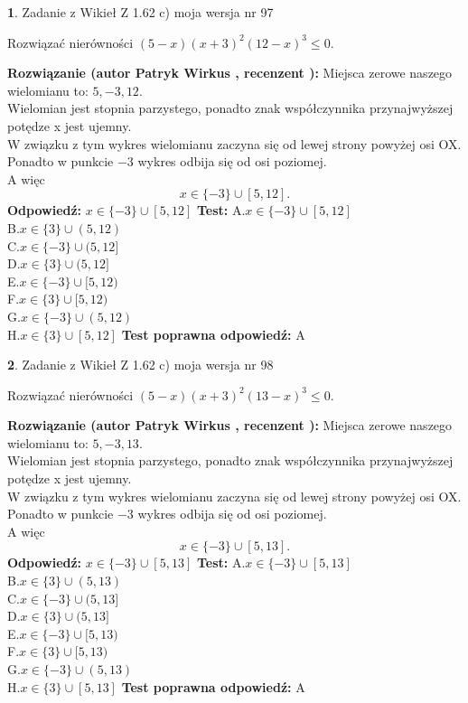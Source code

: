 \documentclass[12pt, a4paper]{article}
\theoremstyle{definition} %
\newtheorem{zad}{}
\newcommand{\zadStart}[1]{\begin{zad}#1\newline}
\newcommand{\zadStop}{\end{zad}}
\newcommand{\rozwStart}[2]{\noindent \textbf{Rozwiązanie (autor #1 , recenzent #2): }\newline}
\newcommand{\rozwStop}{\newline}
\newcommand{\odpStart}{\noindent \textbf{Odpowiedź:}\newline}
\newcommand{\odpStop}{\newline}
\newcommand{\testStart}{\noindent \textbf{Test:}\newline}
\newcommand{\testStop}{\newline}
\newcommand{\kluczStart}{\noindent \textbf{Test poprawna odpowiedź:}\newline}
\newcommand{\kluczStop}{\newline}
\begin{document}
\zadStart{Zadanie z Wikieł Z 1.62 c) moja wersja nr 97}

Rozwiązać nierówności $(5-x)(x+3)^{2}(12-x)^{3}\le0$.
\zadStop
\rozwStart{Patryk Wirkus}{}
Miejsca zerowe naszego wielomianu to: $5, -3, 12$.\\
Wielomian jest stopnia parzystego, ponadto znak współczynnika przy\linebreak najwyższej potędze x jest ujemny.\\ W związku z tym wykres wielomianu zaczyna się od lewej strony powyżej osi OX.\\
Ponadto w punkcie $-3$ wykres odbija się od osi poziomej.\\
A więc $$x \in \{-3\} \cup [5,12].$$
\rozwStop
\odpStart
$x \in \{-3\} \cup [5,12]$
\odpStop
\testStart
A.$x \in \{-3\} \cup [5,12]$\\
B.$x \in \{3\} \cup (5,12)$\\
C.$x \in \{-3\} \cup (5,12]$\\
D.$x \in \{3\} \cup (5,12]$\\
E.$x \in \{-3\} \cup [5,12)$\\
F.$x \in \{3\} \cup [5,12)$\\
G.$x \in \{-3\} \cup (5,12)$\\
H.$x \in \{3\} \cup [5,12]$
\testStop
\kluczStart
A
\kluczStop



\zadStart{Zadanie z Wikieł Z 1.62 c) moja wersja nr 98}

Rozwiązać nierówności $(5-x)(x+3)^{2}(13-x)^{3}\le0$.
\zadStop
\rozwStart{Patryk Wirkus}{}
Miejsca zerowe naszego wielomianu to: $5, -3, 13$.\\
Wielomian jest stopnia parzystego, ponadto znak współczynnika przy\linebreak najwyższej potędze x jest ujemny.\\ W związku z tym wykres wielomianu zaczyna się od lewej strony powyżej osi OX.\\
Ponadto w punkcie $-3$ wykres odbija się od osi poziomej.\\
A więc $$x \in \{-3\} \cup [5,13].$$
\rozwStop
\odpStart
$x \in \{-3\} \cup [5,13]$
\odpStop
\testStart
A.$x \in \{-3\} \cup [5,13]$\\
B.$x \in \{3\} \cup (5,13)$\\
C.$x \in \{-3\} \cup (5,13]$\\
D.$x \in \{3\} \cup (5,13]$\\
E.$x \in \{-3\} \cup [5,13)$\\
F.$x \in \{3\} \cup [5,13)$\\
G.$x \in \{-3\} \cup (5,13)$\\
H.$x \in \{3\} \cup [5,13]$
\testStop
\kluczStart
A
\kluczStop
\end{document}
